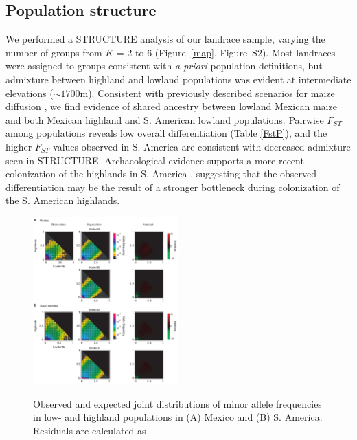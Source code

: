 \subsection*{Population structure}

We performed a {\sf STRUCTURE} analysis \cite[]{Pritchard_2000_10835412,Falush_2003_12930761} of our landrace sample, varying the number of groups from $K$ = 2 to 6 (Figure~\ref{map}, Figure~S2). 
Most landraces were assigned to groups consistent with \emph{a priori} population definitions, but admixture between highland and lowland populations was evident at intermediate elevations ($\sim1700$m).  Consistent with previously described scenarios for maize diffusion \cite[]{Piperno_2006_69}, we find evidence of shared ancestry between lowland Mexican maize and both Mexican highland and S. American lowland populations.  Pairwise $F_{ST}$ among populations reveals low overall differentiation (Table \ref{FstP}), and the higher $F_{ST}$ values observed in S. America are consistent with decreased admixture seen in STRUCTURE.  Archaeological evidence supports a more recent colonization of the highlands in S. America  \cite[]{Piperno_2006_69,Perry_2006_16511492,Grobman_2012_22307642}, suggesting that the observed differentiation may be the result of a stronger bottleneck during colonization of the S. American highlands. 

\begin{figure}[tb]   
  \begin{center}
   \vspace{-0mm}
   \includegraphics[width=0.5\textwidth]{fig/Fig4}
   \renewcommand{\baselinestretch}{0.9}
   \vspace{-3mm}
   \caption{Observed and expected joint distributions of minor allele frequencies in low- and highland populations in (A) Mexico and (B) S. America. Residuals are calculated as  }
\vspace{-6mm}
    \label{JFD}
  \end{center}
\end{figure}
